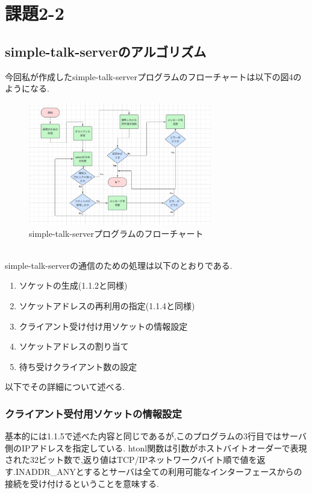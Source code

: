 \documentclass[dvipdfmx]{jarticle}
\begin{document}
\section{課題2-2}
\subsection{simple-talk-serverのアルゴリズム}
今回私が作成したsimple-talk-serverプログラムのフローチャートは以下の図4のようになる.
\begin{figure}[h]
    \center
    \includegraphics[width=8cm]{hurotyaserver.png}
    \caption{simple-talk-serverプログラムのフローチャート}
\end{figure}
\\simple-talk-serverの通信のための処理は以下のとおりである.
\begin{enumerate}
    \item ソケットの生成(1.1.2と同様)
    \item ソケットアドレスの再利用の指定(1.1.4と同様)
    \item クライアント受け付け用ソケットの情報設定
    \item ソケットアドレスの割り当て
    \item 待ち受けクライアント数の設定
\end{enumerate}
以下でその詳細について述べる.
\subsubsection{クライアント受付用ソケットの情報設定}
基本的には1.1.5で述べた内容と同じであるが,このプログラムの3行目ではサーバ側のIPアドレスを指定している.
htonl関数は引数がホストバイトオーダーで表現された32ビット数で,返り値はTCP/IPネットワークバイト順で値を返す.\cite{12}INADDR\_ANYとするとサーバは全ての利用可能なインターフェースからの接続を受け付けるということを意味する.\cite{13}
\end{document}
